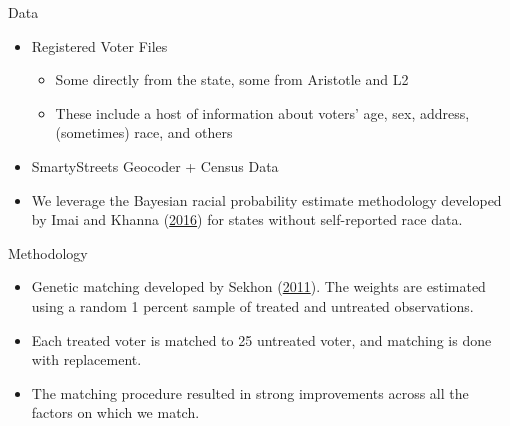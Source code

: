 \documentclass[
  ignorenonframetext,
]{beamer}
\providecommand{\tightlist}{%
  \setlength{\itemsep}{0pt}\setlength{\parskip}{0pt}}
\begin{document}
\begin{frame}{Data}
\protect\hypertarget{data}{}
\begin{itemize}[<+->]
\tightlist
\item
  Registered Voter Files

  \begin{itemize}[<+->]
  \tightlist
  \item
    Some directly from the state, some from Aristotle and L2
  \item
    These include a host of information about voters' age, sex, address,
    (sometimes) race, and others
  \end{itemize}
\end{itemize}

\begin{itemize}[<+->]
\tightlist
\item
  SmartyStreets Geocoder + Census Data
\end{itemize}

\begin{itemize}[<+->]
\tightlist
\item
  We leverage the Bayesian racial probability estimate methodology
  developed by Imai and Khanna (\protect\hyperlink{ref-Imai2016}{2016})
  for states without self-reported race data.
\end{itemize}
\end{frame}

\begin{frame}{Methodology}
\protect\hypertarget{methodology}{}
\begin{itemize}[<+->]
\tightlist
\item
  Genetic matching developed by Sekhon
  (\protect\hyperlink{ref-Sekhon2011}{2011}). The weights are estimated
  using a random 1 percent sample of treated and untreated observations.
\end{itemize}

\begin{itemize}[<+->]
\tightlist
\item
  Each treated voter is matched to 25 untreated voter, and matching is
  done with replacement.
\end{itemize}

\begin{itemize}[<+->]
\tightlist
\item
  The matching procedure resulted in strong improvements across all the
  factors on which we match.
\end{itemize}
\end{frame}
\end{document}
